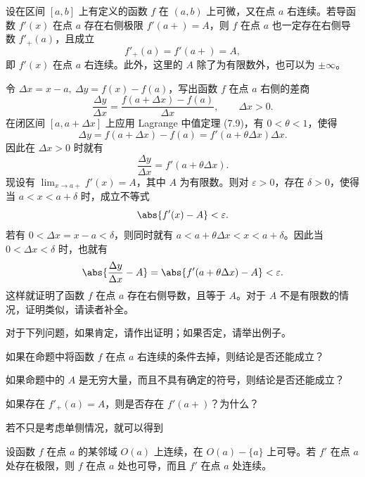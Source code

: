 \begin{xproposition}[7.1.7（单侧导数极限定理）]
设在区间 $[a,b]$ 上有定义的函数 $f$ 在 $(a,b)$ 上可微，又在点 $a$ 右连续。若导函数 $f'(x)$ 在点 $a$ 存在右侧极限 $f'(a+)=A$，则 $f$ 在点 $a$ 也一定存在右侧导数 $f'_+(a)$，且成立
\[
  f'_+(a)=f'(a+)=A,
\]
即 $f'(x)$ 在点 $a$ 右连续。此外，这里的 $A$ 除了为有限数外，也可以为 $\pm\infty$。
\end{xproposition}

\begin{xproof}
令 $\Delta x=x-a,\ \Delta y=f(x)-f(a)$，写出函数 $f$ 在点 $a$ 右侧的差商
\[
  \frac{\Delta y}{\Delta x}=\frac{f(a+\Delta x)-f(a)}{\Delta x},\qquad \Delta x>0.
\]
在闭区间 $[a,a+\Delta x]$ 上应用 Lagrange 中值定理 (7.9)，有 $0<\theta<1$，使得
\[
  \Delta y=f(a+\Delta x)-f(a)=f'(a+\theta\Delta x)\Delta x.
\]
因此在 $\Delta x>0$ 时就有
\[
  \frac{\Delta y}{\Delta x}=f'(a+\theta\Delta x).
\]
现设有 $\lim_{x\to a+}f'(x)=A$，其中 $A$ 为有限数。则对 $\varepsilon>0$，存在 $\delta>0$，使得当 $a<x<a+\delta$ 时，成立不等式
\[
  \abs{f'(x)-A}<\varepsilon.
\]
若有 $0<\Delta x=x-a<\delta$，则同时就有 $a<a+\theta\Delta x<x<a+\delta$。因此当 $0<\Delta x<\delta$ 时，也就有
\[
  \abs{\frac{\Delta y}{\Delta x}-A}=\abs{f'(a+\theta\Delta x)-A}<\varepsilon.
\]
这样就证明了函数 $f$ 在点 $a$ 存在右侧导数，且等于 $A$。对于 $A$ 不是有限数的情况，证明类似，请读者补全。
\end{xproof}

对于下列问题，如果肯定，请作出证明；如果否定，请举出例子。

\begin{xthought}[1]
如果在命题中将函数 $f$ 在点 $a$ 右连续的条件去掉，则结论是否还能成立？
\end{xthought}

\begin{xthought}[2]
如果命题中的 $A$ 是无穷大量，而且不具有确定的符号，则结论是否还能成立？
\end{xthought}

\begin{xthought}[3]
如果存在 $f'_+(a)=A$，则是否存在 $f'(a+)$？为什么？
\end{xthought}

若不只是考虑单侧情况，就可以得到

\begin{xtheorem}[导数极限定理]
设函数 $f$ 在点 $a$ 的某邻域 $O(a)$ 上连续，在 $O(a)-\{a\}$ 上可导。若 $f'$ 在点 $a$ 处存在极限，则 $f$ 在点 $a$ 处也可导，而且 $f'$ 在点 $a$ 处连续。
\end{xtheorem}

